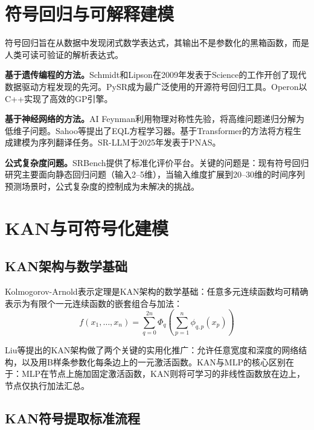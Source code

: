 \documentclass[12pt,a4paper,oneside]{ctexbook}
\begin{document}
\section{符号回归与可解释建模}

符号回归旨在从数据中发现闭式数学表达式，其输出不是参数化的黑箱函数，而是人类可读可验证的解析表达式。

\textbf{基于遗传编程的方法。}Schmidt和Lipson\cite{schmidt2009distilling}在2009年发表于Science的工作开创了现代数据驱动方程发现的先河。PySR\cite{cranmer2023pysr}成为最广泛使用的开源符号回归工具。Operon\cite{burlacu2020operon}以C++实现了高效的GP引擎。

\textbf{基于神经网络的方法。}AI Feynman\cite{udrescu2020ai}利用物理对称性先验，将高维问题递归分解为低维子问题。Sahoo等\cite{sahoo2018learning}提出了EQL方程学习器。基于Transformer的方法\cite{biggio2021neural,kamienny2022end}将方程生成建模为序列翻译任务。SR-LLM\cite{shojaee2025sr}于2025年发表于PNAS。

\textbf{公式复杂度问题。}SRBench\cite{lacava2021srbench}提供了标准化评价平台。关键的问题是：现有符号回归研究主要面向静态回归问题（输入2--5维），当输入维度扩展到20--30维的时间序列预测场景时，公式复杂度的控制成为未解决的挑战。

\section{KAN与可符号化建模}

\subsection{KAN架构与数学基础}

Kolmogorov-Arnold表示定理\cite{kolmogorov1957representation,arnold1957functions}是KAN架构的数学基础：任意多元连续函数均可精确表示为有限个一元连续函数的嵌套组合与加法：
\begin{equation}
f(x_1, \ldots, x_n) = \sum_{q=0}^{2n} \Phi_q \left( \sum_{p=1}^{n} \phi_{q,p}(x_p) \right)
\end{equation}

Liu等\cite{liu2025kan}提出的KAN架构做了两个关键的实用化推广：允许任意宽度和深度的网络结构，以及用B样条参数化每条边上的一元激活函数。KAN与MLP的核心区别在于：MLP在节点上施加固定激活函数，KAN则将可学习的非线性函数放在边上，节点仅执行加法汇总。

\subsection{KAN符号提取标准流程}
\end{document}
